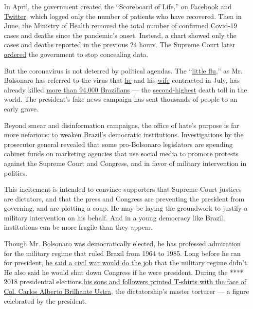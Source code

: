 In April, the government created the ``Scoreboard of Life,'' on
\href{https://www.facebookcorewwwi.onion/minsaude/posts/3549590468392877}{Facebook}
and
\href{https://twitter.com/secomvc/status/1257836970518200323}{Twitter},
which logged only the number of patients who have recovered. Then in
June, the Ministry of Health removed the total number of confirmed
Covid-19 cases and deaths since the pandemic's onset. Instead, a chart
showed only the cases and deaths reported in the previous 24 hours. The
Supreme Court later
\href{https://www.nytimes3xbfgragh.onion/2020/06/19/world/coronavirus-live-updates.html}{ordered}
the government to stop concealing data.

But the coronavirus is not deterred by political agendas. The
``\href{https://www.cnn.com/2020/05/23/americas/brazil-coronavirus-hospitals-intl/index.html}{little
flu},'' as Mr. Bolsonaro has referred to the virus that
\href{https://www.reuters.com/article/us-health-coronavirus-brazil-bolsonaro/brazilian-president-bolsonaro-says-he-has-mold-in-lungs-idUSKCN24V3SH}{he}
and his
\href{https://time.com/5874061/bolsonaro-wife-coronavirus/}{wife}
contracted in July, has already killed
\href{https://www.nytimes3xbfgragh.onion/interactive/2020/world/americas/brazil-coronavirus-cases.html}{more
than 94,000 Brazilians} --- the
\href{https://coronavirus.jhu.edu/map.html}{second-highest} death toll
in the world. The president's fake news campaign has sent thousands of
people to an early grave.

Beyond smear and disinformation campaigns, the office of hate's purpose
is far more nefarious: to weaken Brazil's democratic institutions.
Investigations by the prosecutor general revealed that some
pro-Bolsonaro legislators are spending cabinet funds on marketing
agencies that use social media to promote protests against the Supreme
Court and Congress, and in favor of military intervention in politics.

This incitement is intended to convince supporters that Supreme Court
justices are dictators, and that the press and Congress are preventing
the president from governing, and are plotting a coup. He may be laying
the groundwork to justify a military intervention on his behalf. And in
a young democracy like Brazil, institutions can be more fragile than
they appear.

Though Mr. Bolsonaro was democratically elected, he has professed
admiration for the military regime that ruled Brazil from 1964 to 1985.
Long before he ran for president,
\href{https://www.youtube.com/watch?v=qIDyw9QKIvw\&t=577s}{he said a
civil war would do the job} that the military regime didn't. He also
said he would shut down Congress if he were president. During the ****
2018 presidential
elections,\href{https://congressoemfoco.uol.com.br/especial/noticias/fas-usam-imagem-de-torturador-para-promover-bolsonaro/}{his
sons and followers printed T-shirts with the face of Col. Carlos Alberto
Brilhante Ustra}, the dictatorship's master torturer --- a figure
celebrated by the president.

